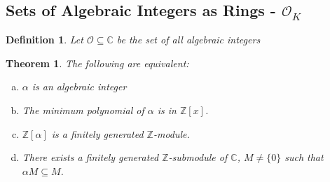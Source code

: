 \documentclass{article}
\newcommand{\C}{\mathbb{C}}
\newcommand{\air}{\mathcal{O}_K}
\newcommand{\Z}{\mathbb{Z}}
\newtheorem{theorem}{Theorem}[subsection]
\newtheorem{definition}{Definition}[subsection]
\begin{document}
\subsection{Sets of Algebraic Integers as Rings - $\air$}
\begin{definition}
Let $\mathcal{O}\subseteq \C$ be the set of all algebraic integers
\end{definition}
\begin{theorem}
The following are equivalent:
\begin{enumerate}[(a)]
    \item $\alpha$ is an algebraic integer
    \item The minimum polynomial of $\alpha$ is in $\Z[x]$.
    \item $\Z[\alpha]$ is a finitely generated $\Z$-module. 
    \item There exists a finitely generated $\Z$-submodule of $\C$, $M\neq \{0\}$ such that $\alpha M\subseteq M$.
\end{enumerate}
\end{theorem}
\end{document}

